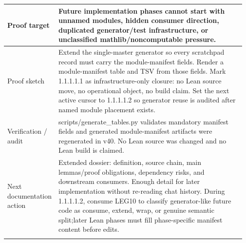 \begin{longtable}{L{0.16\linewidth} L{0.81\linewidth}}
\hline\addlinespace[0.20em]
Proof target & Future implementation phases cannot start with unnamed modules, hidden consumer direction, duplicated generator/\allowbreak{}test infrastructure, or unclassified mathlib/\allowbreak{}noncomputable pressure.\\
\hline\addlinespace[0.20em]
Proof sketch & Extend the single-master generator so every scratchpad record must carry the module-manifest fields. Render a module-manifest table and TSV from those fields. Mark 1.1.1.1.1 as infrastructure-only closure: no Lean source move, no operational object, no build claim. Set the next active cursor to 1.1.1.1.2 so generator reuse is audited after named module placement exists.\\
\hline\addlinespace[0.20em]
Verification /\allowbreak{} audit & scripts/\allowbreak{}generate\_tables.py validates mandatory manifest fields and generated module-manifest artifacts were regenerated in v40. No Lean source was changed and no Lean build is claimed.\\
\hline\addlinespace[0.20em]
Next documentation action & Extended dossier: definition, source chain, main lemmas/\allowbreak{}proof obligations, dependency risks, and downstream consumers. Enough detail for later implementation without re-reading chat history. During 1.1.1.1.2, consume LEG10 to classify generator-like future code as consume, extend, wrap, or genuine semantic split;\newline later Lean phases must fill phase-specific manifest content before edits.\\
\hline\addlinespace[0.20em]
\end{longtable}
